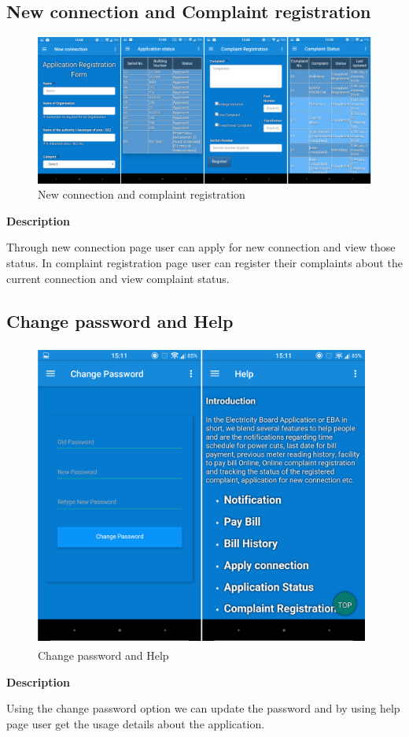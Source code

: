 \documentclass[12pt,a4paper,oneside]{report}
\begin{document}
\newpage
\subsection{New connection and Complaint registration}
\begin{figure}[H]
	\begin{center}
		\includegraphics[scale=0.07]{newcompl.jpg}
			\caption{New connection and complaint registration}
			\label{New connection and complaint registration}
	\end{center}
\end{figure}
\textbf{Description}
\par Through new connection page user can apply for new connection and view those status.
 In complaint registration page user can register their complaints about the current connection and view complaint status.

\newpage
\subsection{Change password and Help}
\begin{figure}[h]
	\begin{center}
		\includegraphics[width=11cm,height=10cm]{helppass.jpg}
			\caption{Change password and Help}
			\label{Change password and Help}
	\end{center}
\end{figure}
\textbf{Description}
\par Using the change password option we can update the password and by using help page user get the usage details about the application.
\end{document}
